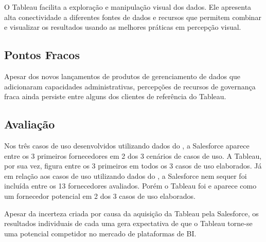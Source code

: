 O Tableau facilita a exploração e manipulação visual dos dados. Ele apresenta alta conectividade a diferentes fontes de dados e recursos que permitem combinar e  visualizar os resultados usando as melhores práticas em
percepção visual. 

\subsection*{Pontos Fracos}

Apesar dos novos lançamentos de produtos de gerenciamento de dados que adicionaram capacidades administrativas,  percepções de recursos de governança fraca ainda persiste entre alguns dos clientes de referência do Tableau. 

\subsection*{Avaliação}

Nos três casos de uso desenvolvidos utilizando dados do \relGCC, a Salesforce aparece entre os 3 primeiros fornecedores em 2 dos 3 cenários de casos de uso. A Tableau, por sua vez, figura entre os 3 primeiros em todos os 3 casos de uso elaborados. Já em relação aos casos de uso utilizando dados do \relFCM, a Salesforce nem sequer foi incluída entre os 13 fornecedores avaliados. Porém o Tableau foi e aparece como um fornecedor potencial em 2 dos 3 casos de uso elaborados.

Apesar da incerteza criada por causa da aquisição da Tableau pela Salesforce, os resultados individuais de cada uma gera expectativa de que o Tableau torne-se uma potencial competidor no mercado de plataformas de BI.